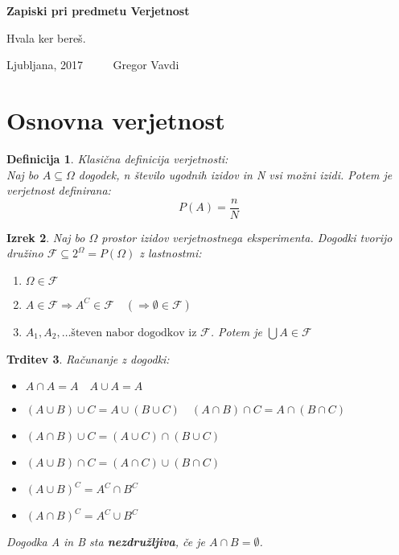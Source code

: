 \documentclass[11pt]{article}
\newtheorem{Izrek}{{\sc Izrek}}[section]
\newtheorem{Trditev}[Izrek]{{\sc Trditev}}
\newtheorem{Definicija}[Izrek]{{\sc Definicija}}
\begin{document}
	
	\thispagestyle{empty}
	\begin{center}
		\begin{Large}
			{\bf Zapiski pri predmetu Verjetnost}
		\end{Large}
		
	\end{center}
	Hvala ker bereš.
	\vfill
	\begin{center}
		Ljubljana, 2017 $\quad \quad $ Gregor Vavdi
	\end{center}
	\newpage
	\setcounter{page}{1}
	
	\section{Osnovna verjetnost}
	\begin{Definicija}
		Klasična definicija verjetnosti:
		\\
		Naj bo  $A\subseteq \Omega $ dogodek, n število ugodnih izidov in N vsi možni izidi. Potem je verjetnost definirana:
		$$P(A) = \frac{n}{N}$$
	\end{Definicija}

	\begin{Izrek}
		Naj bo $\Omega$ prostor izidov verjetnostnega eksperimenta. Dogodki tvorijo družino $\mathcal{F} \subseteq 2^\Omega = P(\Omega)$ z lastnostmi:
		\begin{enumerate}
			\item
			$\Omega \in \mathcal{F}$
			\item
			$ A \in \mathcal{F} \Rightarrow A^C \in \mathcal{F} \quad (\Rightarrow \emptyset \in \mathcal{F})$
			\item
			$A_1, A_2,\dots \text{števen nabor dogodkov iz } \mathcal{F}$. Potem je $\bigcup A \in \mathcal{F}$
		\end{enumerate}
	\end{Izrek}
	
	\begin{Trditev}
		Računanje z dogodki:
		\begin{itemize}
			\item
			$A\cap A = A \quad A\cup A = A$
			\item
			$(A\cup B)\cup C = A\cup (B \cup C) \quad (A\cap B) \cap C = A \cap (B\cap C)$
			\item
			$(A\cap B)\cup C = (A \cup C ) \cap (B\cup C)$ 
			\item
			$(A\cup B)\cap C = (A \cap C ) \cup (B\cap C)$ 
			\item
			$(A \cup B)^C = A^C \cap B^C$
			\item
			$(A\cap B) ^C = A^C \cup B^C$
		\end{itemize}
		
		Dogodka A in B sta \textbf{nezdružljiva}, če je $A \cap B = \emptyset$.
	\end{Trditev}
		
\end{document}
